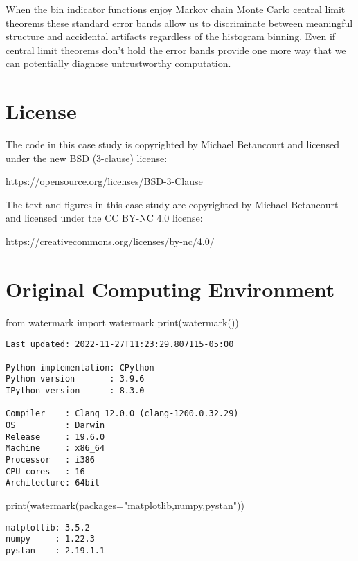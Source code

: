 \documentclass[
  letterpaper,
  DIV=11,
  numbers=noendperiod]{scrartcl}
\newenvironment{Shaded}{\begin{snugshade}}{\end{snugshade}}
\newcommand{\BuiltInTok}[1]{\textcolor[rgb]{0.00,0.23,0.31}{#1}}
\newcommand{\ImportTok}[1]{\textcolor[rgb]{0.00,0.46,0.62}{#1}}
\newcommand{\NormalTok}[1]{\textcolor[rgb]{0.00,0.23,0.31}{#1}}
\newcommand{\OperatorTok}[1]{\textcolor[rgb]{0.37,0.37,0.37}{#1}}
\newcommand{\StringTok}[1]{\textcolor[rgb]{0.13,0.47,0.30}{#1}}
\begin{document}
When the bin indicator functions enjoy Markov chain Monte Carlo central
limit theorems these standard error bands allow us to discriminate
between meaningful structure and accidental artifacts regardless of the
histogram binning. Even if central limit theorems don't hold the error
bands provide one more way that we can potentially diagnose
untrustworthy computation.

\hypertarget{license}{%
\section*{License}\label{license}}

The code in this case study is copyrighted by Michael Betancourt and
licensed under the new BSD (3-clause) license:

https://opensource.org/licenses/BSD-3-Clause

The text and figures in this case study are copyrighted by Michael
Betancourt and licensed under the CC BY-NC 4.0 license:

https://creativecommons.org/licenses/by-nc/4.0/

\hypertarget{original-computing-environment}{%
\section*{Original Computing
Environment}\label{original-computing-environment}}

\begin{Shaded}
\begin{Highlighting}[]
\ImportTok{from}\NormalTok{ watermark }\ImportTok{import}\NormalTok{ watermark}
\BuiltInTok{print}\NormalTok{(watermark())}
\end{Highlighting}
\end{Shaded}

\begin{verbatim}
Last updated: 2022-11-27T11:23:29.807115-05:00

Python implementation: CPython
Python version       : 3.9.6
IPython version      : 8.3.0

Compiler    : Clang 12.0.0 (clang-1200.0.32.29)
OS          : Darwin
Release     : 19.6.0
Machine     : x86_64
Processor   : i386
CPU cores   : 16
Architecture: 64bit
\end{verbatim}

\begin{Shaded}
\begin{Highlighting}[]
\BuiltInTok{print}\NormalTok{(watermark(packages}\OperatorTok{=}\StringTok{"matplotlib,numpy,pystan"}\NormalTok{))}
\end{Highlighting}
\end{Shaded}

\begin{verbatim}
matplotlib: 3.5.2
numpy     : 1.22.3
pystan    : 2.19.1.1
\end{verbatim}
\end{document}
